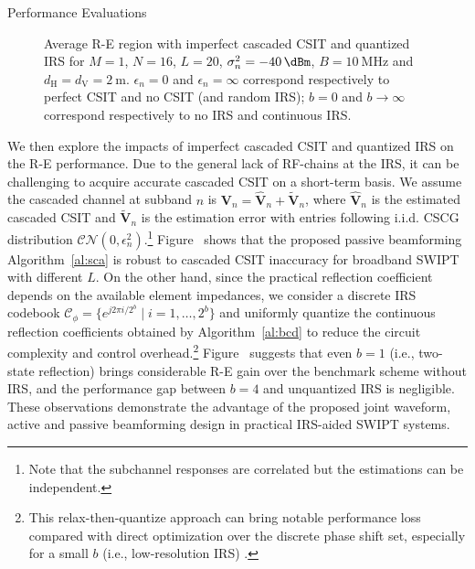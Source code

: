 \documentclass[journal,12pt,onecolumn,draftclsnofoot]{IEEEtran}
\begin{document}
\begin{section}{Performance Evaluations}
		\begin{figure}[!t]
			\centering
			\caption{Average R-E region with imperfect cascaded CSIT and quantized IRS for $M=1$, $N=16$, $L=20$, $\sigma_n^2=\SI{-40}{\dBm}$, $B=\SI{10}{\MHz}$ and $d_{\mathrm{H}}=d_{\mathrm{V}}=\SI{2}{\meter}$. $\epsilon_{n}=0$ and $\epsilon_{n}=\infty$ correspond respectively to perfect CSIT and no CSIT (and random IRS); $b=0$ and $b \to \infty$ correspond respectively to no IRS and continuous IRS.}
		\end{figure}

		We then explore the impacts of imperfect cascaded CSIT and quantized IRS on the R-E performance. Due to the general lack of RF-chains at the IRS, it can be challenging to acquire accurate cascaded CSIT on a short-term basis. We assume the cascaded channel at subband $n$ is $\boldsymbol{V}_{n} = \hat{\boldsymbol{V}}_{n} + \tilde{\boldsymbol{V}}_{n}$, where $\hat{\boldsymbol{V}}_{n}$ is the estimated cascaded CSIT and $\tilde{\boldsymbol{V}}_{n}$ is the estimation error with entries following i.i.d. CSCG distribution $\mathcal{CN}(0, \epsilon_{n}^2)$.\footnote{Note that the subchannel responses are correlated but the estimations can be independent.} Figure~ shows that the proposed passive beamforming Algorithm~\ref{al:sca} is robust to cascaded CSIT inaccuracy for broadband SWIPT with different $L$. On the other hand, since the practical reflection coefficient depends on the available element impedances, we consider a discrete IRS codebook $\mathcal{C}_\phi = \{e^{j 2 \pi i / 2^b} \mid i = 1, \dots, 2^b\}$ and uniformly quantize the continuous reflection coefficients obtained by Algorithm~\ref{al:bcd} to reduce the circuit complexity and control overhead.\footnote{This relax-then-quantize approach can bring notable performance loss compared with direct optimization over the discrete phase shift set, especially for a small $b$ (i.e., low-resolution IRS) \cite{Wu2020c}.} Figure~ suggests that even $b=1$ (i.e., two-state reflection) brings considerable R-E gain over the benchmark scheme without IRS, and the performance gap between $b=4$ and unquantized IRS is negligible. These observations demonstrate the advantage of the proposed joint waveform, active and passive beamforming design in practical IRS-aided SWIPT systems.
	\end{section}
\end{document}
